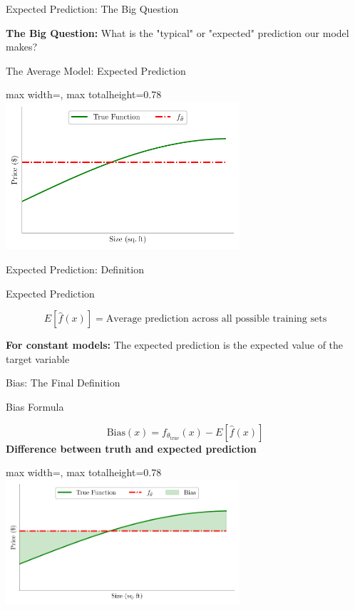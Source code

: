 \documentclass[10pt]{beamer}
\newcommand{\fitpic}[1]{\begin{adjustbox}{max width=\linewidth, max totalheight=0.78\textheight}#1\end{adjustbox}}
\begin{document}
\begin{frame}{Expected Prediction: The Big Question}
\footnotesize
\begin{examplebox}
\raggedright
\textbf{The Big Question:} What is the "typical" or "expected" prediction our model makes?
\end{examplebox}
\end{frame}

\begin{frame}{The Average Model: Expected Prediction}
\footnotesize
\begin{center}
\fitpic{\includegraphics[width=0.65\textwidth]{../assets/bias-variance/figures/bias5.pdf}}
\end{center}
\end{frame}

\begin{frame}{Expected Prediction: Definition}
\footnotesize
\begin{definitionbox}{Expected Prediction}
\raggedright
$$E[\hat{f}(x)] = \text{Average prediction across all possible training sets}$$
\end{definitionbox}

\begin{keypointsbox}
\raggedright
\textbf{For constant models:} The expected prediction is the expected value of the target variable
\end{keypointsbox}
\end{frame}


\begin{frame}{Bias: The Final Definition}
\small
\begin{definitionbox}{Bias Formula}
\raggedright
$$\text{Bias}(x) = f_{\theta_{\text{true}}}(x) - E[\hat{f}(x)]$$
\textbf{Difference between truth and expected prediction}
\end{definitionbox}

\begin{center}
\fitpic{\includegraphics[width=0.65\textwidth]{../assets/bias-variance/figures/bias6.pdf}}
\end{center}
\end{frame}
\end{document}
